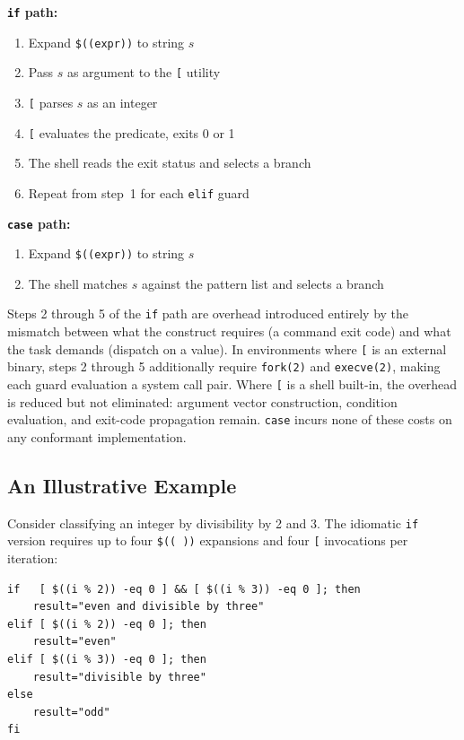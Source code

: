 \documentclass[11pt,a4paper]{article}
\begin{document}
\medskip
\noindent\textbf{\texttt{if} path:}
\begin{enumerate}
	\setlength{\itemsep}{1pt}
	\item Expand \texttt{\$((expr))} to string $s$
	\item Pass $s$ as argument to the \texttt{[} utility
	\item \texttt{[} parses $s$ as an integer
	\item \texttt{[} evaluates the predicate, exits 0 or 1
	\item The shell reads the exit status and selects a branch
	\item Repeat from step~1 for each \texttt{elif} guard
\end{enumerate}

\medskip
\noindent\textbf{\texttt{case} path:}
\begin{enumerate}
	\setlength{\itemsep}{1pt}
	\item Expand \texttt{\$((expr))} to string $s$
	\item The shell matches $s$ against the pattern list and
	      selects a branch
\end{enumerate}

\medskip
Steps 2 through 5 of the \texttt{if} path are overhead introduced
entirely by the mismatch between what the construct requires (a
command exit code) and what the task demands (dispatch on a value).
In environments where \texttt{[} is an external binary, steps 2
through 5 additionally require \texttt{fork(2)} and
\texttt{execve(2)}, making each guard evaluation a system call pair.
Where \texttt{[} is a shell built-in, the overhead is reduced but
not eliminated: argument vector construction, condition evaluation,
and exit-code propagation remain.
\texttt{case} incurs none of these costs on any conformant
implementation.

\subsection{An Illustrative Example}

Consider classifying an integer by divisibility by 2 and 3.
The idiomatic \texttt{if} version requires up to four
\texttt{\$((\ ))} expansions and four \texttt{[} invocations
per iteration:

\begin{lstlisting}[numbers=none,frame=none,aboveskip=2pt,belowskip=2pt]
if   [ $((i % 2)) -eq 0 ] && [ $((i % 3)) -eq 0 ]; then
    result="even and divisible by three"
elif [ $((i % 2)) -eq 0 ]; then
    result="even"
elif [ $((i % 3)) -eq 0 ]; then
    result="divisible by three"
else
    result="odd"
fi
\end{lstlisting}
\end{document}
